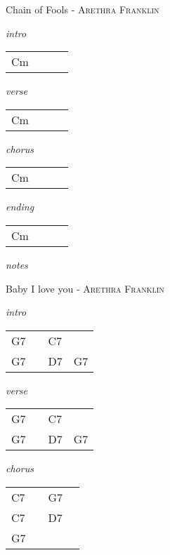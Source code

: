 \documentclass[12pt]{article}
\begin{document}
{\Huge Chain of Fools} {\huge - \textsc{Arethra Franklin}}

\huge
\textit{intro}

\begin{tabular}{|P{1.25in}|P{1.25in}|P{1.25in}|P{1.25in}|}
  Cm &   &   &   \\
\end{tabular}

\textit{verse}

\begin{tabular}{|P{1.25in}|P{1.25in}|P{1.25in}|P{1.25in}|}
  Cm &   &   &   \\
\end{tabular}

\textit{chorus}

\begin{tabular}{|P{1.25in}|P{1.25in}|P{1.25in}|P{1.25in}|}
  Cm &   &   &   \\
\end{tabular}

\textit{ending}

\begin{tabular}{|P{1.25in}|P{1.25in}|P{1.25in}|P{1.25in}|}
  Cm &   &   &   \\
\end{tabular}

\textit{notes}

\newpage

{\Huge Baby I love you} {\huge - \textsc{Arethra Franklin}}

\huge
\textit{intro}

\begin{tabular}{|P{1.25in}|P{1.25in}|P{1.25in}|P{1.25in}|}
  G7 &   & C7  &   \\
  G7 &   & D7  & G7 \\
\end{tabular}

\textit{verse}

\begin{tabular}{|P{1.25in}|P{1.25in}|P{1.25in}|P{1.25in}|}
  G7 &   & C7  &   \\
  G7 &   & D7  & G7 \\
\end{tabular}

\textit{chorus}

\begin{tabular}{|P{1.25in}|P{1.25in}|P{1.25in}|P{1.25in}|}
  C7 &   &  G7 &   \\
  C7 &   &  D7 &   \\
  G7 &   &     &   \\
\end{tabular}
\end{document}
